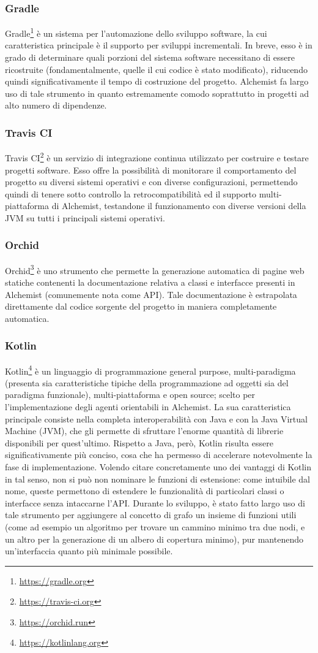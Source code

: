 \documentclass[12pt,a4paper,openright,oneside]{book}
\begin{document}
\subsubsection{Gradle}
Gradle\footnote{\url{https://gradle.org}} è un sistema per l'automazione dello sviluppo software, la cui caratteristica principale è il supporto per sviluppi incrementali. In breve, esso è in grado di determinare quali porzioni del sistema software necessitano di essere ricostruite (fondamentalmente, quelle il cui codice è stato modificato), riducendo quindi significativamente il tempo di costruzione del progetto. Alchemist fa largo uso di tale strumento in quanto estremamente comodo soprattutto in progetti ad alto numero di dipendenze.
\subsubsection{Travis CI}
Travis CI\footnote{\url{https://travis-ci.org}} è un servizio di integrazione continua utilizzato per costruire e testare progetti software. Esso offre la possibilità di monitorare il comportamento del progetto su diversi sistemi operativi e con diverse configurazioni, permettendo quindi di tenere sotto controllo la retrocompatibilità ed il supporto multi-piattaforma di Alchemist, testandone il funzionamento con diverse versioni della JVM su tutti i principali sistemi operativi.
\subsubsection{Orchid}
Orchid\footnote{\url{https://orchid.run}} è uno strumento che permette la generazione automatica di pagine web statiche contenenti la documentazione relativa a classi e interfacce presenti in Alchemist (comunemente nota come API). Tale documentazione è estrapolata direttamente dal codice sorgente del progetto in maniera completamente automatica.
\subsubsection{Kotlin}
Kotlin\footnote{\url{https://kotlinlang.org}} è un linguaggio di programmazione general purpose, multi-paradigma (presenta sia caratteristiche tipiche della programmazione ad oggetti sia del paradigma funzionale), multi-piattaforma e open source; scelto per l'implementazione degli agenti orientabili in Alchemist. La sua caratteristica principale consiste nella completa interoperabilità con Java e con la Java Virtual Machine (JVM), che gli permette di sfruttare l'enorme quantità di librerie disponibili per quest'ultimo. Rispetto a Java, però, Kotlin risulta essere significativamente più conciso, cosa che ha permesso di accelerare notevolmente la fase di implementazione. Volendo citare concretamente uno dei vantaggi di Kotlin in tal senso, non si può non nominare le funzioni di estensione: come intuibile dal nome, queste permettono di estendere le funzionalità di particolari classi o interfacce senza intaccarne l'API. Durante lo sviluppo, è stato fatto largo uso di tale strumento per aggiungere al concetto di grafo un insieme di funzioni utili (come ad esempio un algoritmo per trovare un cammino minimo tra due nodi, e un altro per la generazione di un albero di copertura minimo), pur mantenendo un'interfaccia quanto più minimale possibile.
\end{document}
